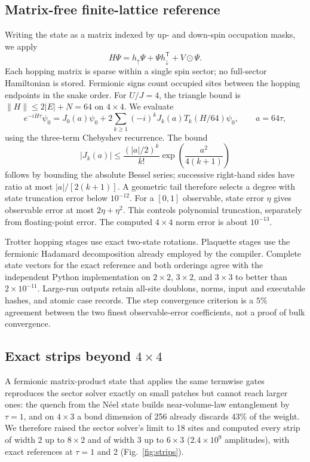 \documentclass[11pt]{article}
\begin{document}
\subsection{Matrix-free finite-lattice reference}
Writing the state as a matrix indexed by up- and down-spin occupation masks,
we apply
\begin{equation}
 H\Psi=h_\uparrow\Psi+\Psi h_\downarrow^{\mathsf T}+V\odot\Psi.
\end{equation}
Each hopping matrix is sparse within a single spin sector; no full-sector
Hamiltonian is stored. Fermionic signs count occupied sites between the
hopping endpoints in the snake order. For $U/J=4$, the triangle bound is
$\|H\|\leq2|E|+N=64$ on $4\times4$. We evaluate
\begin{equation}
 e^{-iH\tau}\psi_0=J_0(a)\psi_0+
 2\sum_{k\geq1}(-i)^kJ_k(a)T_k(H/64)\psi_0,\qquad a=64\tau,
\end{equation}
using the three-term Chebyshev recurrence. The bound
\begin{equation}
 |J_k(a)|\leq\frac{(|a|/2)^k}{k!}
       \exp\!\left(\frac{a^2}{4(k+1)}\right)
\end{equation}
follows by bounding the absolute Bessel series; successive right-hand
sides have ratio at most $|a|/[2(k+1)]$. A geometric tail therefore selects
a degree with state truncation error below $10^{-12}$. For a $[0,1]$
observable, state error $\eta$ gives observable error at most
$2\eta+\eta^2$. This controls polynomial truncation, separately from
floating-point error. The computed $4\times4$ norm error is about
$10^{-13}$.

Trotter hopping stages use exact two-state rotations. Plaquette stages
use the fermionic Hadamard decomposition already employed by the compiler.
Complete state vectors for the exact reference and both orderings agree
with the independent Python implementation on $2\times2$, $3\times2$,
and $3\times3$ to better than $2\times10^{-11}$. Large-run outputs retain
all-site doublons, norms, input and executable hashes, and atomic case
records. The step convergence criterion is a $5\%$ agreement between the
two finest observable-error coefficients, not a proof of bulk convergence.

\subsection{Exact strips beyond $4\times4$}\label{sec:strips}
A fermionic matrix-product state that applies the same termwise gates reproduces
the sector solver exactly on small patches but cannot reach larger ones: the
quench from the N\'eel state builds near-volume-law entanglement by $\tau=1$, and
on $4\times3$ a bond dimension of 256 already discards 43\% of the weight. We
therefore raised the sector solver's limit to 18 sites and computed every strip
of width 2 up to $8\times2$ and of width 3 up to $6\times3$ ($2.4\times10^9$
amplitudes), with exact references at $\tau=1$ and 2
(Fig.~\ref{fig:strips}).
\end{document}
